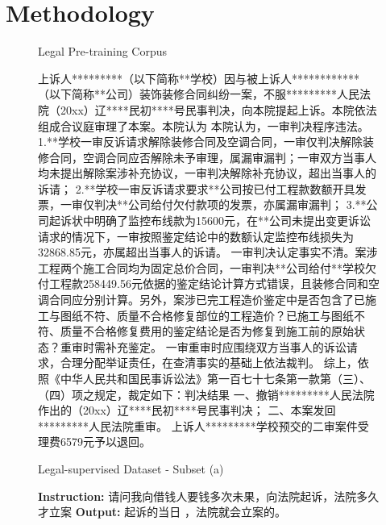 \section{Methodology}
\label{sec:methodology}

\begin{figure}[t]
    \begin{definedbox}[label=ex:pre-training-corpus]{Legal Pre-training Corpus}
        \begin{CJK*}{UTF8}{gbsn}
        上诉人*********（以下简称**学校）因与被上诉人************（以下简称**公司）装饰装修合同纠纷一案，不服*********人民法院（20xx）辽****民初****号民事判决，向本院提起上诉。本院依法组成合议庭审理了本案。本院认为 本院认为，一审判决程序违法。
        1.**学校一审反诉请求解除装修合同及空调合同，一审仅判决解除装修合同，空调合同应否解除未予审理，属漏审漏判；一审双方当事人均未提出解除案涉补充协议，一审判决解除补充协议，超出当事人的诉请；
        2.**学校一审反诉请求要求**公司按已付工程款数额开具发票，一审仅判决**公司给付欠付款项的发票，亦属漏审漏判；
        3.**公司起诉状中明确了监控布线款为15600元，在**公司未提出变更诉讼请求的情况下，一审按照鉴定结论中的数额认定监控布线损失为32868.85元，亦属超出当事人的诉请。 
        一审判决认定事实不清。案涉工程两个施工合同均为固定总价合同，一审判决**公司给付**学校欠付工程款258449.56元依据的鉴定结论计算方式错误，且装修合同和空调合同应分别计算。另外，案涉已完工程造价鉴定中是否包含了已施工与图纸不符、质量不合格修复部位的工程造价？已施工与图纸不符、质量不合格修复费用的鉴定结论是否为修复到施工前的原始状态？重审时需补充鉴定。 一审重审时应围绕双方当事人的诉讼请求，合理分配举证责任，在查清事实的基础上依法裁判。 综上，依照《中华人民共和国民事诉讼法》第一百七十七条第一款第（三）、（四）项之规定，裁定如下：判决结果 一、撤销*********人民法院作出的（20xx）辽****民初****号民事判决； 二、本案发回*********人民法院重审。 上诉人*********学校预交的二审案件受理费6579元予以退回。\end{CJK*}
    \end{definedbox}
    \vskip -0.1in
\end{figure}

\begin{figure}[t]
    \begin{definedbox}[label=ex:sft-corpus-a]{Legal-supervised Dataset - Subset (a)}
        \begin{CJK*}{UTF8}{gbsn}
        \textbf{Instruction:} 请问我向借钱人要钱多次未果，向法院起诉，法院多久才立案
        \tcbline
        \textbf{Output:} 起诉的当日 ，法院就会立案的。\end{CJK*}
    \end{definedbox}
    \vskip -0.1in
\end{figure}

